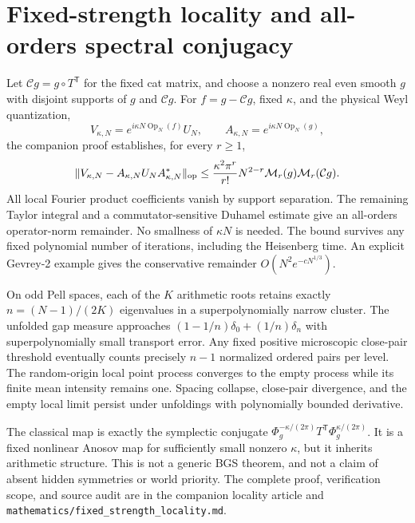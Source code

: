\section{Fixed-strength locality and all-orders spectral conjugacy}
Let $\mathcal Cg=g\circ T^{\mathsf T}$ for the fixed cat matrix, and choose a
nonzero real even smooth $g$ with disjoint supports of $g$ and $\mathcal Cg$.
For $f=g-\mathcal Cg$, fixed $\kappa$, and the physical Weyl quantization,
\[
 V_{\kappa,N}=e^{i\kappa N\operatorname{Op}_N(f)}U_N,
 \qquad A_{\kappa,N}=e^{i\kappa N\operatorname{Op}_N(g)},
\]
the companion proof establishes, for every $r\geq1$,
\[
 \|V_{\kappa,N}-A_{\kappa,N}U_NA_{\kappa,N}^*\|_{\rm op}
 \leq \frac{\kappa^2\pi^r}{r!}N^{2-r}
       \mathcal M_r(g)\mathcal M_r(\mathcal Cg).
\]
All local Fourier product coefficients vanish by support separation. The
remaining Taylor integral and a commutator-sensitive Duhamel estimate give
an all-orders operator-norm remainder. No smallness of $\kappa N$ is needed.
The bound survives any fixed polynomial number of iterations, including
the Heisenberg time. An explicit Gevrey-2 example gives the conservative
remainder $O(N^2e^{-cN^{1/3}})$.

On odd Pell spaces, each of the $K$ arithmetic roots retains exactly
$n=(N-1)/(2K)$ eigenvalues in a superpolynomially narrow cluster. The
unfolded gap measure approaches $(1-1/n)\delta_0+(1/n)\delta_n$ with
superpolynomially small transport error. Any fixed positive microscopic
close-pair threshold eventually counts precisely $n-1$ normalized ordered
pairs per level. The random-origin local point process converges to the
empty process while its finite mean intensity remains one. Spacing collapse,
close-pair divergence, and the empty local limit persist under unfoldings
with polynomially bounded derivative.

The classical map is exactly the symplectic conjugate
$\Phi_g^{-\kappa/(2\pi)}T^{\mathsf T}\Phi_g^{\kappa/(2\pi)}$.
It is a fixed nonlinear Anosov map for sufficiently small nonzero $\kappa$,
but it inherits arithmetic structure. This is not a generic BGS theorem,
and not a claim of absent hidden symmetries or world priority. The complete
proof, verification scope, and source audit are in the companion locality
article and \texttt{mathematics/fixed\_strength\_locality.md}.
